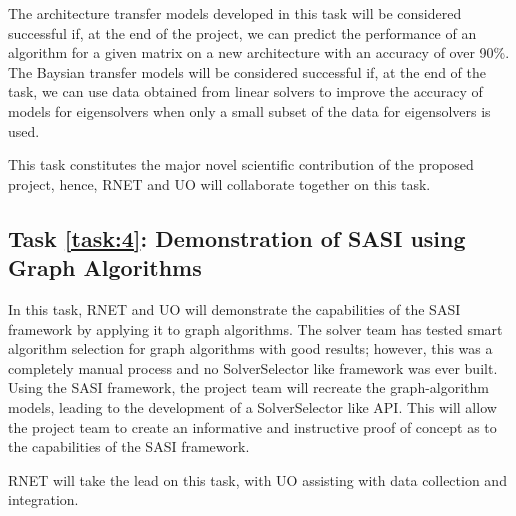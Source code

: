 The architecture transfer models developed in this task will be considered successful if, at the end of the project, we can predict the performance of an algorithm for a given matrix on a new architecture with an accuracy of over 90\%. The Baysian transfer models will be considered successful if, at the end of the task, we can use data obtained from linear solvers to improve the accuracy of models for eigensolvers when only a small subset of the data for eigensolvers is used.  

This task constitutes the major novel scientific contribution of the proposed project, hence, RNET and UO will collaborate together on this task. 

\label{task:4}
\subsection{Task \ref{task:4}: Demonstration of SASI using Graph Algorithms }

In this task, RNET and UO will demonstrate the capabilities of the SASI framework by applying 
it to graph algorithms. The solver team has tested smart algorithm selection for graph algorithms 
with good results; however, this was a completely manual process and no SolverSelector like framework was ever built. Using 
the SASI framework, the project team will recreate the graph-algorithm models, leading to the development of a SolverSelector
like API. This will allow the project team to create an informative and instructive proof of concept as to the capabilities 
of the SASI framework. 

RNET will take the lead on this task, with UO assisting with data collection and integration. 
